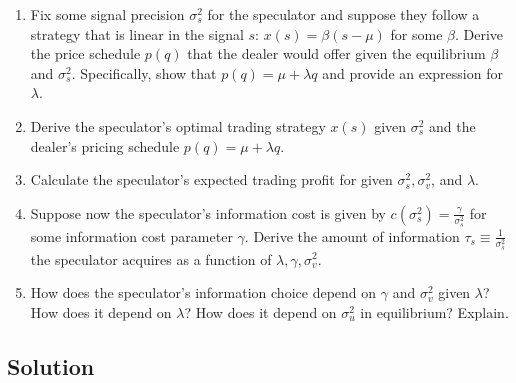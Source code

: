 \documentclass[a4paper]{article}
\newif\ifsolutions
\begin{document}
\begin{enumerate}
	\item Fix some signal precision $\sigma^2_s$ for the speculator and suppose they follow a strategy that is linear in the signal $s$: $x(s) = \beta (s-\mu)$ for some $\beta$. Derive the price schedule $p(q)$ that the dealer would offer given the equilibrium $\beta$ and $\sigma^2_s$. Specifically, show that $p(q) = \mu + \lambda q$ and provide an expression for $\lambda$.
	
	\item Derive the speculator's optimal trading strategy $x(s)$ given $\sigma^2_s$ and the dealer's pricing schedule $p(q) = \mu + \lambda q$.
	
	\item Calculate the speculator's expected trading profit for given $\sigma^2_s, \sigma^2_v$, and $\lambda$.
	
	\item Suppose now the speculator's information cost is given by $c(\sigma^2_s) = \frac{\gamma}{{\sigma^2_s}}$ for some information cost parameter $\gamma$. Derive the amount of information $\tau_s \equiv \frac{1}{\sigma^2_s}$ the speculator acquires as a function of $\lambda, \gamma, \sigma^2_v$. 
	
	\item How does the speculator's information choice depend on $\gamma$ and $\sigma_v^2$ given $\lambda$? How does it depend on $\lambda$? How does it depend on $\sigma^2_u$ in equilibrium? Explain.
\end{enumerate}


\ifsolutions
\subsection*{Solution}
\end{document}
